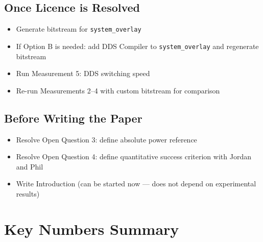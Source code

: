 \documentclass[11pt,a4paper]{article}
\begin{document}
\subsection{Once Licence is Resolved}

\begin{itemize}[leftmargin=2em,itemsep=4pt]
  \item[$\square$] Generate bitstream for \texttt{system\_overlay}
  \item[$\square$] If Option B is needed: add DDS Compiler to \texttt{system\_overlay}
        and regenerate bitstream
  \item[$\square$] Run Measurement 5: DDS switching speed
  \item[$\square$] Re-run Measurements 2--4 with custom bitstream for comparison
\end{itemize}

\subsection{Before Writing the Paper}

\begin{itemize}[leftmargin=2em,itemsep=4pt]
  \item[$\square$] Resolve Open Question 3: define absolute power reference
  \item[$\square$] Resolve Open Question 4: define quantitative success criterion
        with Jordan and Phil
  \item[$\square$] Write Introduction (can be started now --- does not depend on
        experimental results)
\end{itemize}

\section{Key Numbers Summary}
\end{document}
